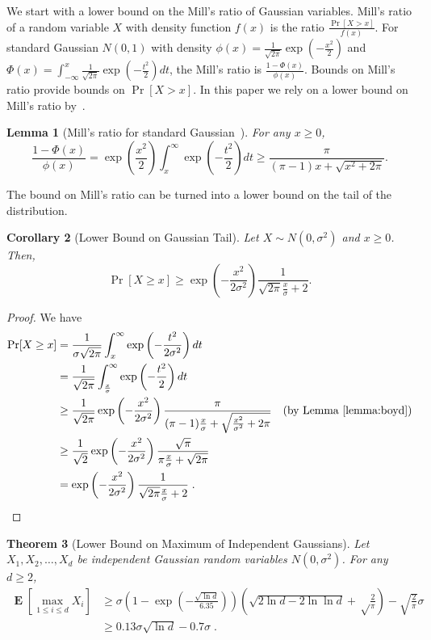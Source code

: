 \documentclass{article}
\DeclareMathOperator*{\Exp}{\mathbf{E}}
\newtheorem{theorem}{Theorem}
\newtheorem{lemma}[theorem]{Lemma}
\newtheorem{corrollary}[theorem]{Corollary}
\begin{document}
We start with a lower bound on the Mill's ratio of Gaussian variables. Mill's ratio of a random variable $X$
with density function $f(x)$ is the ratio $\frac{\Pr[X > x]}{f(x)}$. For standard Gaussian
$N(0,1)$ with density $\phi(x) = \frac{1}{\sqrt{2 \pi}} \exp\left( - \frac{x^2}{2} \right)$
and $\Phi(x) = \int_{-\infty}^x \frac{1}{\sqrt{2 \pi}} \exp\left( - \frac{t^2}{2} \right) dt$,
the Mill's ratio is $\frac{1 - \Phi(x)}{\phi(x)}$. Bounds on Mill's ratio provide bounds on $\Pr[X > x]$.
In this paper we rely on a lower bound on Mill's ratio by~\cite{Boyd-1959}.

\begin{lemma}[Mill's ratio for standard Gaussian~\citep{Boyd-1959}]
\label{lemma:boyd}
For any $x \ge 0$,
$$
\frac{1 - \Phi(x)}{\phi(x)}
= \exp\left(\frac{x^2}{2}\right) \int_x^{\infty} \exp\left(-\frac{t^2}{2}\right) dt
\ge \frac{\pi}{(\pi-1)x+\sqrt{x^2+2 \pi}}.
$$
\end{lemma}

The bound on Mill's ratio can be turned into a lower bound on the tail of the distribution.

\begin{corrollary}[Lower Bound on Gaussian Tail]
Let $X \sim N(0, \sigma^2)$ and $x \ge 0$. Then,
$$
\Pr[X \ge x] \ge \exp\left(-\frac{x^2}{2 \sigma^2}\right) \frac{1}{\sqrt{2\pi}\frac{x}{\sigma}+2}.
$$
\end{corrollary}

\begin{proof}
We have
\begin{align*}
\Pr[X \ge x]
& = \frac{1}{\sigma \sqrt{2 \pi}} \int_x^{\infty} \exp \left( -\frac{t^2}{2 \sigma^2} \right) d t \\
& = \frac{1}{\sqrt{2 \pi}} \int_\frac{x}{\sigma}^{\infty} \exp \left( -\frac{t^2}{2} \right) d t \\
& \ge \frac{1}{\sqrt{2 \pi}} \exp\left(-\frac{x^2}{2 \sigma^2}\right) \frac{\pi}{(\pi-1)\frac{x}{\sigma}+\sqrt{\frac{x^2}{\sigma^2}+2 \pi}} & \text{(by Lemma~\ref{lemma:boyd})} \\
& \ge \frac{1}{\sqrt{2}} \exp\left(-\frac{x^2}{2 \sigma^2}\right) \frac{\sqrt{\pi}}{\pi\frac{x}{\sigma}+\sqrt{2 \pi}} \\
& = \exp\left(-\frac{x^2}{2 \sigma^2}\right) \frac{1}{\sqrt{2\pi}\frac{x}{\sigma}+2} \; .
\end{align*}
\end{proof}

\begin{theorem}[Lower Bound on Maximum of Independent Gaussians]
Let $X_1, X_2, \dots, X_d$ be independent Gaussian random variables $N(0,\sigma^2)$. For any $d \ge 2$,
\begin{align}
\Exp \left[\max_{1 \le i \le d} X_i\right]
& \ge \sigma \left(1 - \exp\left(-\frac{\sqrt{\ln d}}{6.35}\right)\right) \left(\sqrt{2 \ln d - 2 \ln \ln d} +\sqrt\frac{2}{\pi}\right) -\sqrt{\frac{2}{\pi}} \sigma \label{equation:maximum-of-gaussians-lower-bound-1} \\
& \ge 0.13 \sigma \sqrt{\ln d} - 0.7 \sigma \label{equation:maximum-of-gaussians-lower-bound-2} \; .
\end{align}
\end{theorem}
\end{document}
